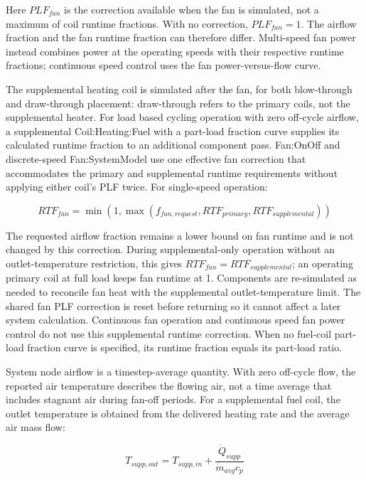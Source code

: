 Here \(PLF_{fan}\) is the correction available when the fan is simulated, not a maximum of coil runtime fractions. With no correction, \(PLF_{fan}=1\). The airflow fraction and the fan runtime fraction can therefore differ. Multi-speed fan power instead combines power at the operating speeds with their respective runtime fractions; continuous speed control uses the fan power-versus-flow curve.

The supplemental heating coil is simulated after the fan, for both blow-through and draw-through placement: draw-through refers to the primary coils, not the supplemental heater. For load based cycling operation with zero off-cycle airflow, a supplemental Coil:Heating:Fuel with a part-load fraction curve supplies its calculated runtime fraction to an additional component pass. Fan:OnOff and discrete-speed Fan:SystemModel use one effective fan correction that accommodates the primary and supplemental runtime requirements without applying either coil's PLF twice. For single-speed operation:

\begin{equation}
RTF_{fan} = \min\left(1,\max\left(f_{fan,request},RTF_{primary},RTF_{supplemental}\right)\right)
\end{equation}

The requested airflow fraction remains a lower bound on fan runtime and is not changed by this correction. During supplemental-only operation without an outlet-temperature restriction, this gives \(RTF_{fan}=RTF_{supplemental}\); an operating primary coil at full load keeps fan runtime at 1. Components are re-simulated as needed to reconcile fan heat with the supplemental outlet-temperature limit. The shared fan PLF correction is reset before returning so it cannot affect a later system calculation. Continuous fan operation and continuous speed fan power control do not use this supplemental runtime correction. When no fuel-coil part-load fraction curve is specified, its runtime fraction equals its part-load ratio.

System node airflow is a timestep-average quantity. With zero off-cycle flow, the reported air temperature describes the flowing air, not a time average that includes stagnant air during fan-off periods. For a supplemental fuel coil, the outlet temperature is obtained from the delivered heating rate and the average air mass flow:

\begin{equation}
T_{supp,out} = T_{supp,in} + \frac{\dot Q_{supp}}{\dot m_{avg}c_p}
\end{equation}

